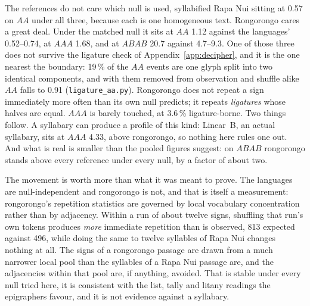 \documentclass[11pt,a4paper]{article}
\begin{document}
The references do not care which null is used, syllabified Rapa Nui sitting at 0.57 on $AA$ under all three, because each is one homogeneous text. Rongorongo cares a great deal. Under the matched null it sits at $AA$ 1.12 against the languages' 0.52--0.74, at $AAA$ 1.68, and at $ABAB$ 20.7 against 4.7--9.3. One of those three does not survive the ligature check of Appendix~\ref{app:decipher}, and it is the one nearest the boundary: 19\,\% of the $AA$ events are one glyph split into two identical components, and with them removed from observation and shuffle alike $AA$ falls to 0.91 (\texttt{ligature\_aa.py}). Rongorongo does not repeat a sign immediately more often than its own null predicts; it repeats \emph{ligatures} whose halves are equal. $AAA$ is barely touched, at 3.6\,\% ligature-borne. Two things follow. A syllabary can produce a profile of this kind: Linear~B, an actual syllabary, sits at $AAA$ 4.33, above rongorongo, so nothing here rules one out. And what is real is smaller than the pooled figures suggest: on $ABAB$ rongorongo stands above every reference under every null, by a factor of about two.

The movement is worth more than what it was meant to prove. The languages are null-independent and rongorongo is not, and that is itself a measurement: rongorongo's repetition statistics are governed by local vocabulary concentration rather than by adjacency. Within a run of about twelve signs, shuffling that run's own tokens produces \emph{more} immediate repetition than is observed, 813 expected against 496, while doing the same to twelve syllables of Rapa Nui changes nothing at all. The signs of a rongorongo passage are drawn from a much narrower local pool than the syllables of a Rapa Nui passage are, and the adjacencies within that pool are, if anything, avoided. That is stable under every null tried here, it is consistent with the list, tally and litany readings the epigraphers favour, and it is not evidence against a syllabary.
\end{document}
